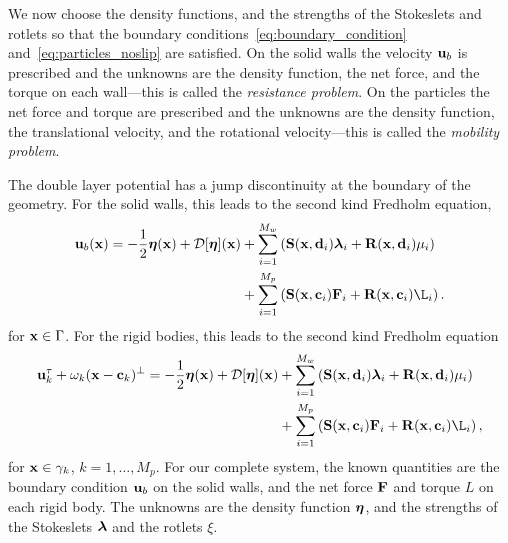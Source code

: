 \documentclass[preprint, 10pt]{elsarticle}
\begin{document}
We now choose the density functions, and the strengths of the Stokeslets
and rotlets so that the boundary
conditions~\eqref{eq:boundary_condition} and~\eqref{eq:particles_noslip}
are satisfied.  On the solid walls the velocity ${\mathbf{u}}_b$ is prescribed
and the unknowns are the density function, the net force, and the torque
on each wall---this is called the {\em resistance problem}.  On the
particles the net force and torque are prescribed and the unknowns are
the density function, the translational velocity, and the rotational
velocity---this is called the {\em mobility problem}. 

The double layer potential has a jump discontinuity at the boundary of
the geometry.  For the solid walls, this leads to the second kind
Fredholm equation,
\begin{equation}
  \label{eq:vel_walls} 
  \begin{aligned}
  \uu_b(\xx) = -\frac{1}{2}\eeta(\xx) + 
    \mathcal{D}[\eeta](\mathbf{x}) 
    &+ \sum_{i=1}^{M_w} \left(\mathbf{S}(\xx,\dd_i)\llambda_i +
    \mathbf{R}(\xx,\dd_i)\mu_i\right)  \\
    &+ \sum_{i=1}^{M_p} \left(\mathbf{S}(\xx,\cc_i)\FF_i +
    \mathbf{R}(\xx,\cc_i)\L_i\right).
  \end{aligned}
\end{equation}
for ${\mathbf{x}} \in \Gamma$.  For the rigid bodies, this leads to the second
kind Fredholm equation
\begin{equation}
  \label{eq:vel_particles} 
  \begin{aligned}
  \uu_k^\tau + \omega_k(\xx - \cc_k)^\perp
  = -\frac{1}{2}\eeta(\xx) + 
    \mathcal{D}[\eeta](\mathbf{x}) 
    &+ \sum_{i=1}^{M_w} \left(\mathbf{S}(\xx,\dd_i)\llambda_i +
    \mathbf{R}(\xx,\dd_i)\mu_i\right) \\
    &+ \sum_{i=1}^{M_p} \left(\mathbf{S}(\xx,\cc_i)\FF_i +
    \mathbf{R}(\xx,\cc_i)\L_i\right),
  \end{aligned}
\end{equation}
for ${\mathbf{x}} \in \gamma_k$, $k=1,\ldots,M_p$.  For our complete system, the
known quantities are the boundary condition ${\mathbf{u}}_b$ on the solid walls,
and the net force ${\mathbf{F}}$ and torque $L$ on each rigid body.  The unknowns
are the density function ${\boldsymbol\eta}$, and the strengths of the Stokeslets
${\boldsymbol\lambda}$ and the rotlets $\xi$.
\end{document}
